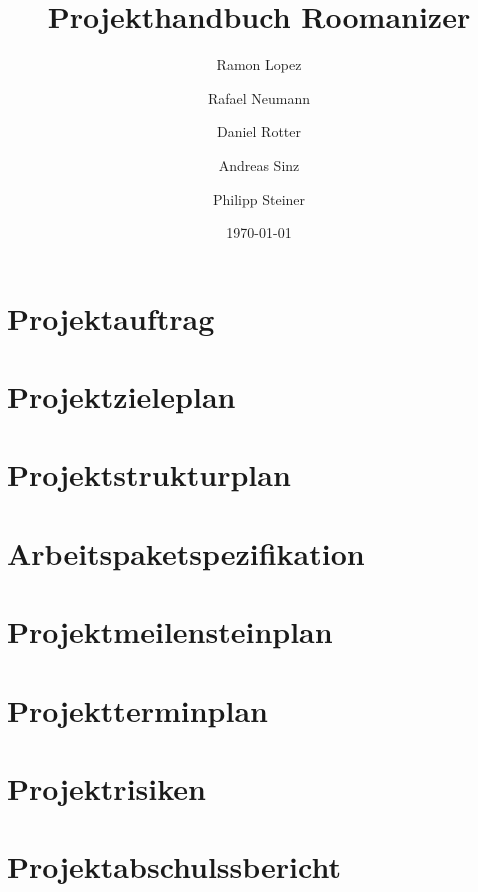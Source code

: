 \documentclass[10pt,a4paper,titlepage]{article}
\begin{document}
\fancyhf{}

\lhead{\leftmark}

\title{Projekthandbuch Roomanizer}
\author{Ramon Lopez \and Rafael Neumann \and Daniel Rotter \and Andreas Sinz \and Philipp Steiner}
\date{\today}
\maketitle

\tableofcontents
\newpage

\section{Projektauftrag}
\newpage

\section{Projektzieleplan}
\newpage

\section{Projektstrukturplan}
\newpage

\section{Arbeitspaketspezifikation}
\newpage

\section{Projektmeilensteinplan}
\newpage

\section{Projektterminplan}
\newpage

\section{Projektrisiken}
\newpage

\section{Projektabschulssbericht}
\newpage
\end{document}
